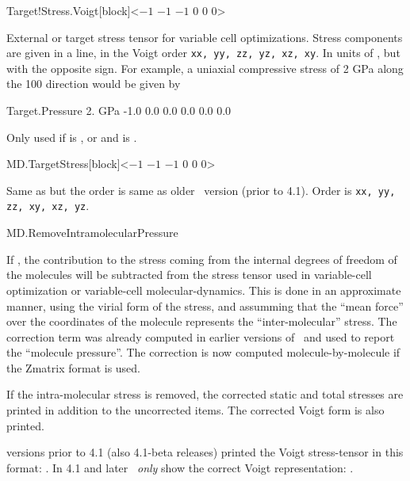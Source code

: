 \begin{fdfentry}{Target!Stress.Voigt}[block]<$-1$ $-1$ $-1$ $0$ $0$ $0$>
  
  External or target stress tensor for variable cell optimizations.
  Stress components are given in a line, in the Voigt order \texttt{xx, yy,
      zz, yz, xz, xy}. In units of , but
  with the opposite sign. For example, a uniaxial compressive stress
  of 2 GPa along the 100 direction would be given by
  \begin{fdfexample}
     Target.Pressure  2. GPa
         -1.0  0.0  0.0  0.0  0.0  0.0
  \end{fdfexample}

  Only used if  is ,  or
   and  is \fdftrue.

\end{fdfentry}

\begin{fdfentry}{MD.TargetStress}[block]<$-1$ $-1$ $-1$ $0$ $0$ $0$>

  Same as  but the order is same as older
  \siesta\ version (prior to 4.1). Order is \texttt{xx, yy, zz, xy,
      xz, yz}.

\end{fdfentry}


\begin{fdflogicalF}{MD.RemoveIntramolecularPressure}

  If \fdftrue, the contribution to the stress coming from the internal
  degrees of freedom of the molecules will be subtracted from the
  stress tensor used in variable-cell optimization or variable-cell
  molecular-dynamics.  This is done in an approximate manner, using
  the virial form of the stress, and assumming that the ``mean force''
  over the coordinates of the molecule represents the
  ``inter-molecular'' stress. The correction term was already computed
  in earlier versions of \siesta\ and used to report the ``molecule
  pressure''. The correction is now computed molecule-by-molecule if
  the Zmatrix format is used.

  If the intra-molecular stress is removed, the corrected static and
  total stresses are printed in addition to the uncorrected items.
  The corrected Voigt form is also printed.

  \note versions prior to 4.1 (also 4.1-beta releases) printed the
  Voigt stress-tensor in this format: \shell{[x, y, z, xy, yz,
      xz]}. In 4.1 and later \siesta\ \emph{only} show the correct
  Voigt representation: \shell{[x, y, z, yz, xz, xy]}.

\end{fdflogicalF}



